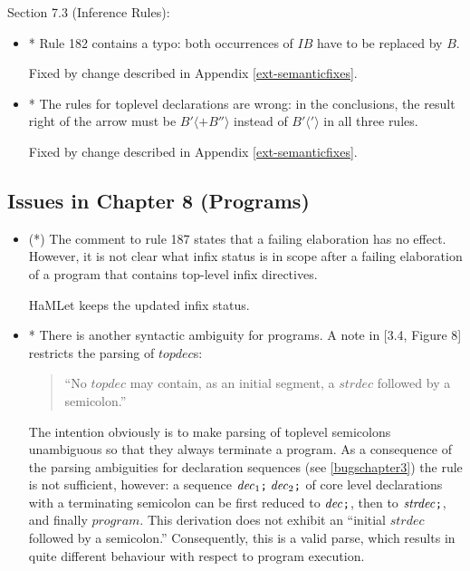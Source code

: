 \documentclass[twoside,titlepage]{article}
\begin{document}
\begin{appendix}
\begin{itemize}
\end{itemize}


Section 7.3 (Inference Rules):

\begin{itemize}

\item * Rule 182 contains a typo: both occurrences of $\mathit{IB}$ have to be replaced by $B$.

Fixed by change described in Appendix \ref{ext-semanticfixes}.

\item * The rules for toplevel declarations are wrong: in the conclusions, the result right of the arrow must be $B' \langle+ B''\rangle$ instead of $B'\langle'\rangle$ in all three rules.

Fixed by change described in Appendix \ref{ext-semanticfixes}.

\end{itemize}


\subsection{Issues in Chapter 8 (Programs)}
\label{bugschapter8}

\begin{itemize}
\item (*) The comment to rule 187 states that a failing elaboration has no effect. However, it is not clear what infix status is in scope after a failing elaboration of a program that contains top-level infix directives.

HaMLet keeps the updated infix status.

\item * There is another syntactic ambiguity for programs. A note in [3.4, Figure 8] restricts the parsing of $\mathit{topdec}$s:

\begin{quote}
``No $\mathit{topdec}$ may contain, as an initial segment, a $\mathit{strdec}$ followed by a semicolon.''
\end{quote}

The intention obviously is to make parsing of toplevel semicolons unambiguous so that they always terminate a program. As a consequence of the parsing ambiguities for declaration sequences (see \ref{bugschapter3}) the rule is not sufficient, however: a sequence $\mathit{dec}_1\mbox{\tt;}\;\mathit{dec}_2\mbox{\tt;}$ of core level declarations with a terminating semicolon can be first reduced to $\mathit{dec}\mbox{\tt;}$, then to $\mathit{strdec}\mbox{\tt;}$, and finally $\mathit{program}$. This derivation does not exhibit an ``initial $\mathit{strdec}$ followed by a semicolon.'' Consequently, this is a valid parse, which results in quite different behaviour with respect to program execution.


\end{itemize}
\end{appendix}
\end{document}

